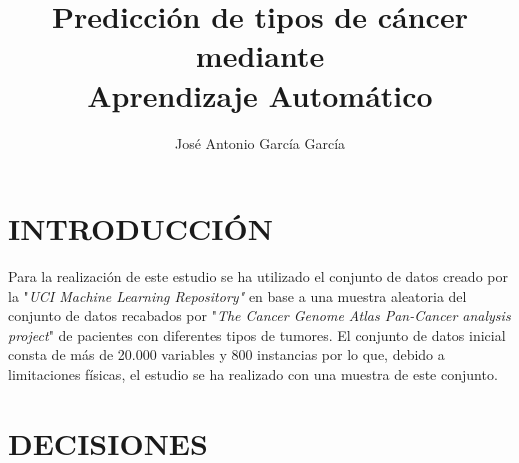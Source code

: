 \documentclass[10pt,twocolumn,letterpaper,a4paper]{article}
\begin{document}
%
%

\title{\textbf{\LARGE{Predicción de tipos de cáncer mediante \\ Aprendizaje Automático}}\\}
\author{José Antonio García García}


%
%

\section{INTRODUCCIÓN}

Para la realización de este estudio se ha utilizado el conjunto de datos creado por la "\textit{UCI Machine Learning Repository"} en base a una muestra aleatoria del conjunto de datos recabados por "\textit{The Cancer Genome Atlas Pan-Cancer analysis project}" de pacientes con diferentes tipos de tumores. El conjunto de datos inicial consta de más de 20.000 variables y 800 instancias por lo que, debido a limitaciones físicas, el estudio se ha realizado con una muestra de este conjunto.


\section{DECISIONES}
\end{document}
